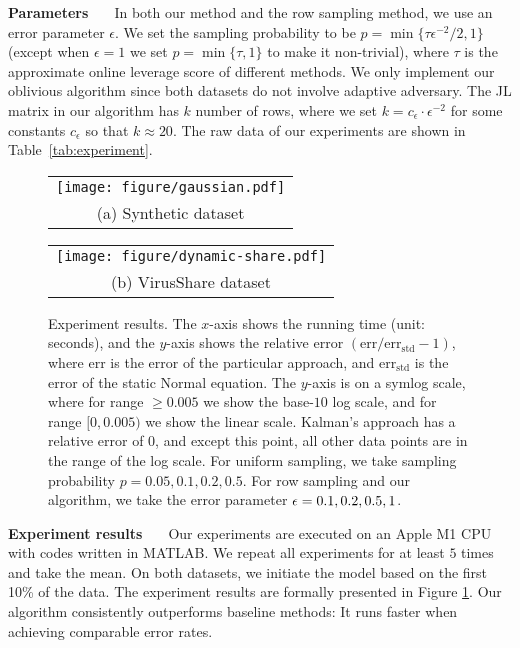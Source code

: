 \vspace{+2mm}
{\noindent \bf Parameters \ \ } In both our method and the row sampling method, we use an error parameter $\epsilon$. We set the sampling probability to be $p = \min\{\tau \epsilon^{-2} / 2, 1\}$ (except when $\epsilon=1$ we set $p = \min\{\tau, 1\}$ to make it non-trivial), where $\tau$ is the approximate online leverage score of different methods. 
We only implement our oblivious algorithm since both datasets do not involve adaptive adversary.
The JL matrix in our algorithm has $k$ number of rows, where we set $k = c_{\epsilon} \cdot \epsilon^{-2}$ for some constants $c_{\epsilon}$ so that $k \approx 20$.  The raw data of our experiments are shown in Table~\ref{tab:experiment}.


\begin{figure}[!htbp]
\centering
  \begin{tabular}{@{}c@{}}
    \texttt{[image: figure/gaussian.pdf]}
    \\[\abovecaptionskip] \small (a) Synthetic dataset
      \end{tabular}
  \begin{tabular}{@{}c@{}}
    \texttt{[image: figure/dynamic-share.pdf]}
    \\[\abovecaptionskip] \small (b) VirusShare dataset
    \end{tabular}


\caption{Experiment results. The $x$-axis shows the running time (unit: seconds), and the $y$-axis shows the relative error $(\mathrm{err}/\mathrm{err}_{\mathrm{std}} - 1)$, where $\mathrm{err}$ is the error of the particular approach, and $\mathrm{err}_{\mathrm{std}}$ is the error of the static Normal equation. 
The $y$-axis is on a symlog scale, where for range $\geq 0.005$ we show the base-$10$ log scale, and for range $[0, 0.005)$ we show the linear scale. Kalman's approach has a relative error of $0$, and except this point, all other data points are in the range of the log scale. 
For uniform sampling, we take sampling probability $p=0.05,0.1,0.2,0.5$. For row sampling and our algorithm, we take the error parameter $\epsilon = 0.1, 0.2, 0.5, 1$. }
\label{fig:exp1}
\end{figure}


\vspace{+2mm}
{\noindent \bf Experiment results \ \ }
Our experiments are executed on an Apple M1 CPU with codes written in MATLAB. We repeat all experiments for at least $5$ times and take the mean. 
On both datasets, we initiate the model based on the first 10\% of the data.
The experiment results are formally presented in Figure \ref{fig:exp1}.
Our algorithm consistently outperforms baseline methods: It runs faster when achieving comparable error rates.







